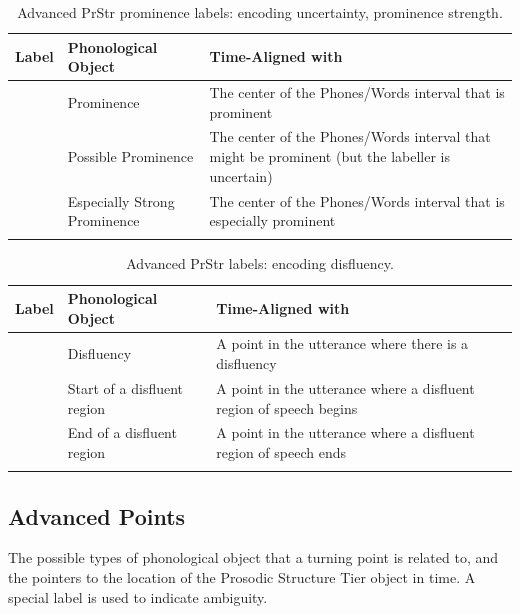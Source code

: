 \documentclass[11pt, twoside]{memoir}
\def\textlabel#1{{\relsize{-.5}\fontspec[Mapping=tex-text]{Roboto Mono}{#1}}}
\begin{document}
\begin{longtable}{cp{.3\linewidth}p{.45\linewidth}}
	\toprule
	\textbf{Label} & \textbf{Phonological Object} & \textbf{Time-Aligned with} \tabularnewline
	\midrule
	\endhead
	\rowcolor{green}
	\textlabel{*} & Prominence & The center of the Phones\slash Words interval that is prominent\tabularnewline
	\textlabel{?*} & Possible Prominence & The center of the Phones\slash Words interval that might be prominent (but the labeller is uncertain) \tabularnewline
	\textlabel{**} & Especially Strong Prominence & The center of the Phones\slash Words interval that is especially prominent \tabularnewline
	\bottomrule
	\caption{Advanced PrStr prominence labels: encoding uncertainty, prominence strength.}
\end{longtable}

\begin{longtable}{cp{.3\linewidth}p{.45\linewidth}}
	\toprule
	\textbf{Label} & \textbf{Phonological Object} & \textbf{Time-Aligned with} \tabularnewline
	\midrule
	\endhead
	\textlabel{d} & Disfluency & A point in the utterance where there is a disfluency\tabularnewline
	\textlabel{\{d} & Start of a disfluent region & A point in the utterance where a disfluent region of speech begins\tabularnewline
	\textlabel{d\}} & End of a disfluent region & A point in the utterance where a disfluent region of speech ends\tabularnewline
	\bottomrule
	\caption{Advanced PrStr labels: encoding disfluency.}
\end{longtable}


\subsection*{Advanced Points}

The possible types of phonological object that a turning point is related to, and the pointers to the location of the Prosodic Structure Tier object in time. A special label is used to indicate ambiguity.
\end{document}
